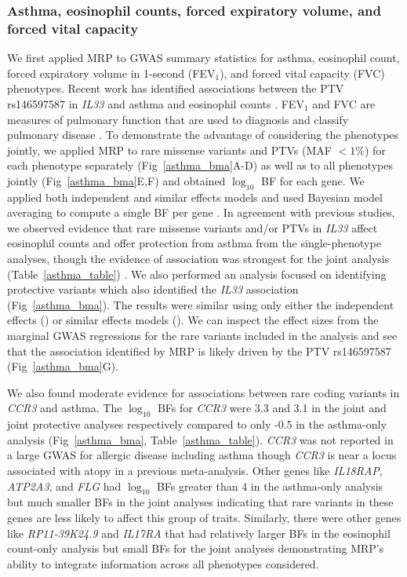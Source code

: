 \subsubsection*{Asthma, eosinophil counts, forced expiratory volume, and forced vital capacity}
We first applied MRP to GWAS summary statistics for asthma, eosinophil count, forced expiratory volume in 1-second (FEV$_1$), and forced vital capacity (FVC) phenotypes. Recent work has identified associations between the PTV rs146597587 in \textit{IL33} and asthma and eosinophil counts \cite{DeBoever179762, 10.1371/journal.pgen.1006659}. FEV$_1$ and FVC are measures of pulmonary function that are used to diagnosis and classify pulmonary disease \cite{Swanney1046}. To demonstrate the advantage of considering the phenotypes jointly, we applied MRP to rare missense variants and PTVs (MAF $< 1\%$) for each phenotype separately (Fig~\ref{asthma_bma}A-D) as well as to all phenotypes jointly (Fig~\ref{asthma_bma}E,F) and obtained $\log_{10}$ BF for each gene. We applied both independent and similar effects models and used Bayesian model averaging to compute a single BF per gene \cite{10.2307/2676803}. In agreement with previous studies, we observed evidence that rare missense variants and/or PTVs in \textit{IL33} affect eosinophil counts and offer protection from asthma from the single-phenotype analyses, though the evidence of association was strongest for the joint analysis (Table~\ref{asthma_table}) \cite{DeBoever179762, 10.1371/journal.pgen.1006659}. We also performed an analysis focused on identifying protective variants which also identified the \textit{IL33} association (Fig~\ref{asthma_bma}). The results were similar using only either the independent effects () or similar effects models (). We can inspect the effect sizes from the marginal GWAS regressions for the rare variants included in the analysis and see that the association identified by MRP is likely driven by the PTV rs146597587 (Fig~\ref{asthma_bma}G). 

We also found moderate evidence for associations between rare coding variants in \textit{CCR3} and asthma. The $\log_{10}$ BFs for \textit{CCR3} were 3.3 and 3.1 in the joint and joint protective analyses respectively compared to only -0.5 in the asthma-only analysis  (Fig~\ref{asthma_bma}, Table~\ref{asthma_table}). \textit{CCR3} was not reported in a large GWAS for allergic disease including asthma\cite{Ferreira:2017ba} though \textit{CCR3} is near a locus associated with atopy in a previous meta-analysis\cite{Ober:2011jk}. Other genes like \textit{IL18RAP}, \textit{ATP2A3}, and \textit{FLG} had $\log_{10}$ BFs greater than 4 in the asthma-only analysis but much smaller BFs in the joint analyses indicating that rare variants in these genes are less likely to affect this group of traits. Similarly, there were other genes like \textit{RP11-39K24.9} and \textit{IL17RA} that had relatively larger BFs in the eosinophil count-only analysis but small BFs for the joint analyses demonstrating MRP's ability to integrate information across all phenotypes considered.

